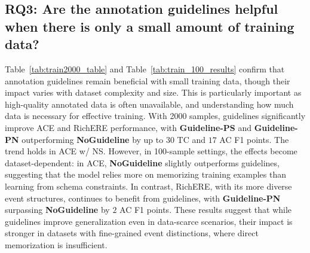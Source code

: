 \subsection{RQ3: Are the annotation guidelines helpful when there is only a small amount of training data?}
Table~\ref{tab:train2000_table} and Table~\ref{tab:train_100_results} confirm that annotation guidelines remain beneficial with small training data, though their impact varies with dataset complexity and size. This is particularly important as high-quality annotated data is often unavailable, and understanding how much data is necessary for effective training. With 2000 samples, guidelines significantly improve ACE and RichERE performance, with \textbf{Guideline-PS} and \textbf{Guideline-PN} outperforming \textbf{NoGuideline} by up to $30$ TC and $17$ AC F1 points. The trend holds in ACE w/ NS. However, in 100-sample settings, the effects become dataset-dependent: in ACE, \textbf{NoGuideline} slightly outperforms guidelines, suggesting that the model relies more on memorizing training examples than learning from schema constraints. In contrast, RichERE, with its more diverse event structures, continues to benefit from guidelines, with \textbf{Guideline-PN} surpassing \textbf{NoGuideline} by $2$ AC F1 points. These results suggest that while guidelines improve generalization even in data-scarce scenarios, their impact is stronger in datasets with fine-grained event distinctions, where direct memorization is insufficient.

